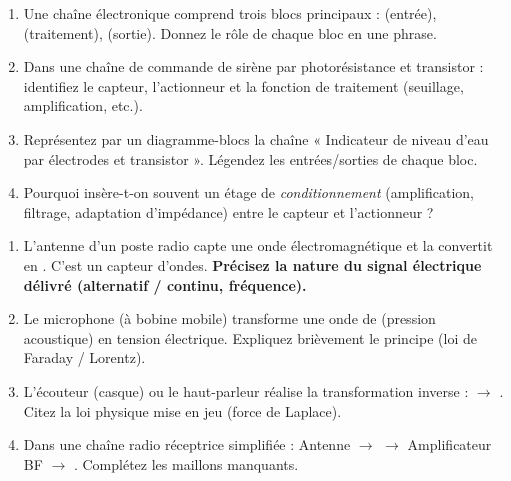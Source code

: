 \documentclass[11pt]{article}
\begin{document}
\begin{exercice}
\begin{enumerate}
    \item Une chaîne électronique comprend trois blocs principaux : \underline{\hspace{2cm}} (entrée), \underline{\hspace{2cm}} (traitement), \underline{\hspace{2cm}} (sortie). Donnez le rôle de chaque bloc en une phrase.
    \item Dans une chaîne de commande de sirène par photorésistance et transistor : identifiez le capteur, l'actionneur et la fonction de traitement (seuillage, amplification, etc.).
    \item Représentez par un diagramme-blocs la chaîne « Indicateur de niveau d'eau par électrodes et transistor ». Légendez les entrées/sorties de chaque bloc.
    \item Pourquoi insère-t-on souvent un étage de \textit{conditionnement} (amplification, filtrage, adaptation d'impédance) entre le capteur et l'actionneur ?
\end{enumerate}
\end{exercice}

\begin{exercice}
\begin{enumerate}
    \item L'antenne d'un poste radio capte une onde électromagnétique et la convertit en \underline{\hspace{3cm}}. C'est un capteur d'ondes. \textbf{Précisez la nature du signal électrique délivré (alternatif / continu, fréquence).}
    \item Le microphone (à bobine mobile) transforme une onde de \underline{\hspace{2cm}} (pression acoustique) en tension électrique. Expliquez brièvement le principe (loi de Faraday / Lorentz).
    \item L'écouteur (casque) ou le haut-parleur réalise la transformation inverse : \underline{\hspace{3cm}} $\rightarrow$ \underline{\hspace{3cm}}. Citez la loi physique mise en jeu (force de Laplace).
    \item Dans une chaîne radio réceptrice simplifiée : Antenne $\rightarrow$ \underline{\hspace{2cm}} $\rightarrow$ Amplificateur BF $\rightarrow$ \underline{\hspace{2cm}}. Complétez les maillons manquants.
\end{enumerate}
\end{exercice}
\end{document}

